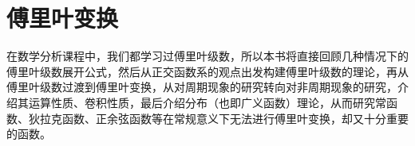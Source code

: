\chapter{傅里叶变换}%
在数学分析课程中，我们都学习过傅里叶级数，所以本书将直接回顾几种情况下的傅里叶级数展开公式，然后从正交函数系的观点出发构建傅里叶级数的理论，再从傅里叶级数过渡到傅里叶变换，从对周期现象的研究转向对非周期现象的研究，介绍其运算性质、卷积性质，最后介绍分布（也即广义函数）理论，从而研究常函数、狄拉克函数、正余弦函数等在常规意义下无法进行傅里叶变换，却又十分重要的函数。





